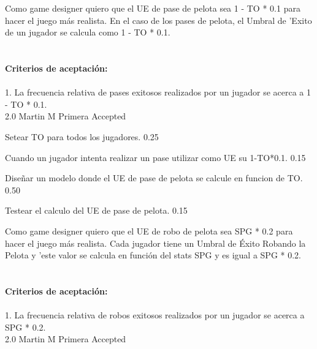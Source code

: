 	{Como game designer quiero que el UE de pase de pelota sea 1 - TO * 0.1 para hacer el juego m\'as realista.} %
	{En el caso de los pases de pelota, el Umbral de 'Exito de un jugador se calcula como 1 - TO * 0.1. \\
  \\
  \\
\textbf{Criterios de aceptación:}\\
  \\
1. La frecuencia relativa de pases exitosos realizados por un jugador se acerca a 1 - TO * 0.1. \\
} %
	{} %
	{2.0} %
	{Martin M} %
	{Primera} %
	{Accepted} %

		{Setear TO para todos los jugadores.} %
		{} %
		{0.25} %
		{} %
		{} %
		{} %

		{Cuando un jugador intenta realizar un pase utilizar como UE su 1-TO*0.1.} %
		{} %
		{0.15} %
		{} %
		{} %
		{} %
	
		{Diseñar un modelo donde el UE de pase de pelota se calcule en funcion de TO.} %
		{} %
		{0.50} %
		{} %
		{} %
		{} %

		{Testear el calculo del UE de pase de pelota.} %
		{} %
		{0.15} %
		{} %
		{} %
		{} %

\vspace{20pt}

	{Como game designer quiero que el UE de robo de pelota sea SPG * 0.2 para hacer el juego m\'as realista.} %
	{Cada jugador tiene un Umbral de Éxito Robando la Pelota y 'este valor se calcula en función del stats SPG y es igual a SPG * 0.2. \\
  \\
  \\
\textbf{Criterios de aceptación:}\\
  \\
1. La frecuencia relativa de robos exitosos realizados por un jugador se acerca a SPG * 0.2. \\
} %
	{} %
	{2.0} %
	{Martin M} %
	{Primera} %
	{Accepted} %

